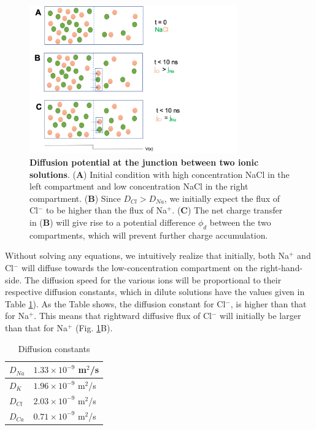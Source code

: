 \begin{figure}[!ht]
\begin{center}
\includegraphics[width=0.8\textwidth]{Figures/Eldiff/Diffusionpot.png}
\end{center}
\caption{\textbf{Diffusion potential at the junction between two ionic solutions}. ({\bf A}) Initial condition with high concentration NaCl in the left compartment and low concentration NaCl in the right compartment. ({\bf B}) Since $D_{Cl} > D_{Na}$, we initially expect the flux of Cl$^-$ to be higher than the flux of Na$^+$. ({\bf C}) The net charge transfer in ({\bf B}) will give rise to a potential difference $\phi_d$ between the two compartments, which will prevent further charge accumulation. }
\label{Eldiff:fig:diffpot}
\end{figure}

Without solving any equations, we intuitively realize that initially, both Na$^+$ and Cl$^-$ will diffuse towards the low-concentration compartment on the right-hand-side. The diffusion speed for the various ions will be proportional to their respective diffusion constants, which in dilute solutions have the values given in Table \ref{tab:diffconsts}). As the Table shows, the diffusion constant for Cl$^-$, is higher than that for Na$^+$. This means that rightward diffusive flux of Cl$^-$ will initially be larger than that for Na$^+$  (Fig. \ref{Eldiff:fig:diffpot}B). 

\begin{table}[h!]
\begin{center}
\caption{Diffusion constants}
\label{tab:diffconsts}
    \begin{tabular}{l|l}
    \hline
    $D_{Na}$ & $1.33\times 10^{-9}$ m$^2$/s\\ \hline
    $D_K$ & $1.96  \times 10^{-9}$ m$^2$/s \\ \hline
    $D_{Cl}$ & $2.03 \times 10^{-9}$ m$^2$/s \\ \hline
    $D_{Ca}$ & $0.71\times 10^{-9}$ m$^2$/s \\ \hline
    \end{tabular}
\end{center}
\end{table}

